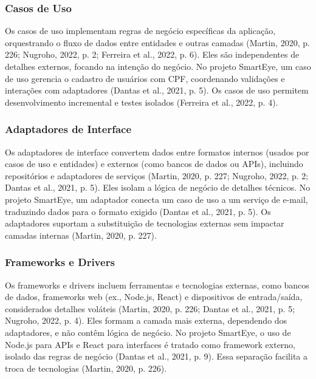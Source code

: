         \subsubsection{Casos de Uso}
            \par Os casos de uso implementam regras de negócio específicas da aplicação, orquestrando o fluxo de dados entre entidades e outras camadas (Martin, 2020, p. 226; Nugroho, 2022, p. 2; Ferreira et al., 2022, p. 6). Eles são independentes de detalhes externos, focando na intenção do negócio. No projeto SmartEye, um caso de uso gerencia o cadastro de usuários com CPF, coordenando validações e interações com adaptadores (Dantas et al., 2021, p. 5). Os casos de uso permitem desenvolvimento incremental e testes isolados (Ferreira et al., 2022, p. 4).
        \subsubsection{Adaptadores de Interface}
            \par Os adaptadores de interface convertem dados entre formatos internos (usados por casos de uso e entidades) e externos (como bancos de dados ou APIs), incluindo repositórios e adaptadores de serviços (Martin, 2020, p. 227; Nugroho, 2022, p. 2; Dantas et al., 2021, p. 5). Eles isolam a lógica de negócio de detalhes técnicos. No projeto SmartEye, um adaptador conecta um caso de uso a um serviço de e-mail, traduzindo dados para o formato exigido (Dantas et al., 2021, p. 5). Os adaptadores suportam a substituição de tecnologias externas sem impactar camadas internas (Martin, 2020, p. 227).
            
        \subsubsection{Frameworks e Drivers}

            \par Os frameworks e drivers incluem ferramentas e tecnologias externas, como bancos de dados, frameworks web (ex., Node.js, React) e dispositivos de entrada/saída, considerados detalhes voláteis (Martin, 2020, p. 226; Dantas et al., 2021, p. 5; Nugroho, 2022, p. 4). Eles formam a camada mais externa, dependendo dos adaptadores, e não contêm lógica de negócio. No projeto SmartEye, o uso de Node.js para APIs e React para interfaces é tratado como framework externo, isolado das regras de negócio (Dantas et al., 2021, p. 9). Essa separação facilita a troca de tecnologias (Martin, 2020, p. 226).

    
